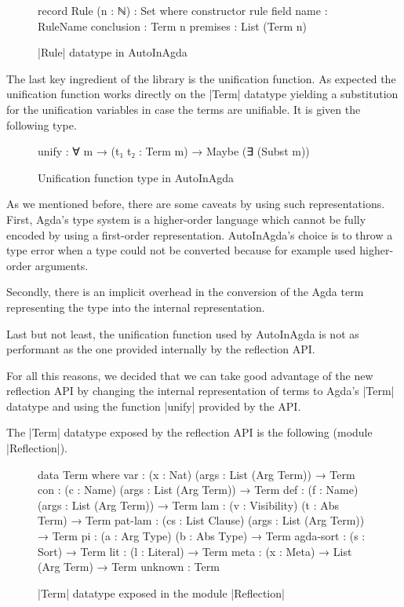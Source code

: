 \documentclass[a4paper]{article}
\begin{document}
\begin{figure}[h]
\label{fig:term:Rule}
\small
\begin{code}
  record Rule (n : ℕ) : Set where
    constructor rule
    field
      name        : RuleName
      conclusion  : Term n
      premises    : List (Term n)
\end{code}
  \caption{|Rule| datatype in AutoInAgda}
\end{figure}

The last key ingredient of the library is the unification function. As expected
the unification function works directly on the |Term| datatype yielding a
substitution for the unification variables in case the terms are unifiable. It
is given the following type.

\begin{figure}
\label{fig:unify:AutoInAgda}
\small
\begin{code}
  unify : ∀ {m} → (t₁ t₂ : Term m) → Maybe (∃ (Subst m))
\end{code}
  \caption{Unification function type in AutoInAgda}
\end{figure}

As we mentioned before, there are some caveats by using such representations.
First, Agda's type system is a higher-order language which cannot be fully
encoded by using a first-order representation. AutoInAgda's choice is to throw a
type error when a type could not be converted because for example used
higher-order arguments.

Secondly, there is an implicit overhead in the conversion of the Agda term
representing the type into the internal representation.

Last but not least, the unification function used by AutoInAgda is not as
performant as the one provided internally by the reflection API.

For all this reasons, we decided that we can take good advantage of the new
reflection API by changing the internal representation of terms to Agda's |Term|
datatype and using the function |unify| provided by the API.

The |Term| datatype exposed by the reflection API is the following (module
|Reflection|).

\begin{figure}[h]
\small
\begin{code}
  data Term where
    var       : (x : Nat) (args : List (Arg Term)) → Term
    con       : (c : Name) (args : List (Arg Term)) → Term
    def       : (f : Name) (args : List (Arg Term)) → Term
    lam       : (v : Visibility) (t : Abs Term) → Term
    pat-lam   : (cs : List Clause) (args : List (Arg Term)) → Term
    pi        : (a : Arg Type) (b : Abs Type) → Term
    agda-sort : (s : Sort) → Term
    lit       : (l : Literal) → Term
    meta      : (x : Meta) → List (Arg Term) → Term
    unknown   : Term
\end{code}
  \label{fig:term:reflection}
  \caption{|Term| datatype exposed in the module |Reflection|}
\end{figure}
\end{document}
